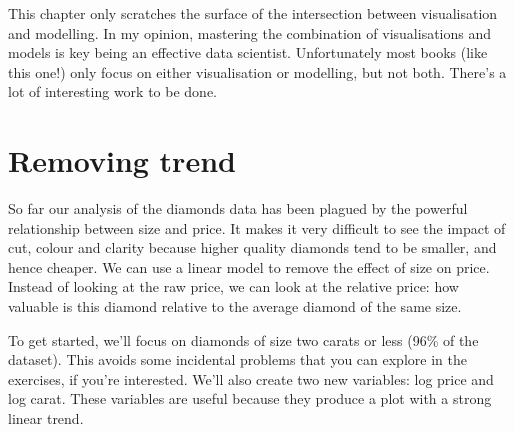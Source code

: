 This chapter only scratches the surface of the intersection between
visualisation and modelling. In my opinion, mastering the combination of
visualisations and models is key being an effective data scientist.
Unfortunately most books (like this one!) only focus on either
visualisation or modelling, but not both. There's a lot of interesting
work to be done.

\section{Removing trend}\label{sub:trend}

So far our analysis of the diamonds data has been plagued by the
powerful relationship between size and price. It makes it very difficult
to see the impact of cut, colour and clarity because higher quality
diamonds tend to be smaller, and hence cheaper. We can use a linear
model to remove the effect of size on price. Instead of looking at the
raw price, we can look at the relative price: how valuable is this
diamond relative to the average diamond of the same size.

To get started, we'll focus on diamonds of size two carats or less (96\%
of the dataset). This avoids some incidental problems that you can
explore in the exercises, if you're interested. We'll also create two
new variables: log price and log carat. These variables are useful
because they produce a plot with a strong linear trend.

